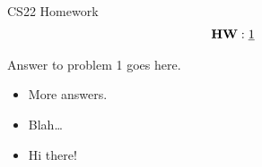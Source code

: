 












\newpage

\begin{center}
    \newcommand{\GradeTableHeader}[1]{\quad\textbf{#1}\quad\mbox{}}
    \renewcommand*{\arraystretch}{1}

    {\huge CS22 Homework}\\

    \Large
    \begin{align*}
        \text{\textbf{HW}}&:
	\text{\underline{1}} \\
    \end{align*}
\end{center}
\newpage

\begin{answer}{1}
Answer to problem 1 goes here.

\begin{itemize}
    \item More answers.
    \item Blah\dots
    \item Hi there!
\end{itemize}
\end{answer}



